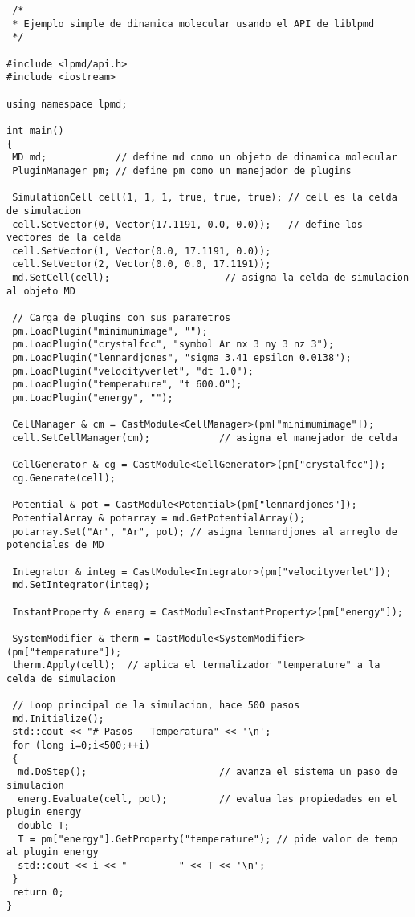 \begin{verbatim}
 /*
 * Ejemplo simple de dinamica molecular usando el API de liblpmd
 */

#include <lpmd/api.h>
#include <iostream>

using namespace lpmd;

int main()
{
 MD md;            // define md como un objeto de dinamica molecular
 PluginManager pm; // define pm como un manejador de plugins

 SimulationCell cell(1, 1, 1, true, true, true); // cell es la celda de simulacion
 cell.SetVector(0, Vector(17.1191, 0.0, 0.0));   // define los vectores de la celda
 cell.SetVector(1, Vector(0.0, 17.1191, 0.0));
 cell.SetVector(2, Vector(0.0, 0.0, 17.1191));
 md.SetCell(cell);                    // asigna la celda de simulacion al objeto MD 

 // Carga de plugins con sus parametros
 pm.LoadPlugin("minimumimage", "");
 pm.LoadPlugin("crystalfcc", "symbol Ar nx 3 ny 3 nz 3");
 pm.LoadPlugin("lennardjones", "sigma 3.41 epsilon 0.0138");
 pm.LoadPlugin("velocityverlet", "dt 1.0");
 pm.LoadPlugin("temperature", "t 600.0");
 pm.LoadPlugin("energy", "");

 CellManager & cm = CastModule<CellManager>(pm["minimumimage"]);
 cell.SetCellManager(cm);            // asigna el manejador de celda

 CellGenerator & cg = CastModule<CellGenerator>(pm["crystalfcc"]);
 cg.Generate(cell);

 Potential & pot = CastModule<Potential>(pm["lennardjones"]);
 PotentialArray & potarray = md.GetPotentialArray();
 potarray.Set("Ar", "Ar", pot); // asigna lennardjones al arreglo de potenciales de MD

 Integrator & integ = CastModule<Integrator>(pm["velocityverlet"]);
 md.SetIntegrator(integ);

 InstantProperty & energ = CastModule<InstantProperty>(pm["energy"]);
 
 SystemModifier & therm = CastModule<SystemModifier>(pm["temperature"]);
 therm.Apply(cell);  // aplica el termalizador "temperature" a la celda de simulacion

 // Loop principal de la simulacion, hace 500 pasos
 md.Initialize(); 
 std::cout << "# Pasos   Temperatura" << '\n';
 for (long i=0;i<500;++i)
 {
  md.DoStep();                       // avanza el sistema un paso de simulacion
  energ.Evaluate(cell, pot);         // evalua las propiedades en el plugin energy
  double T;
  T = pm["energy"].GetProperty("temperature"); // pide valor de temp al plugin energy
  std::cout << i << "         " << T << '\n';
 }
 return 0;
}
\end{verbatim}

